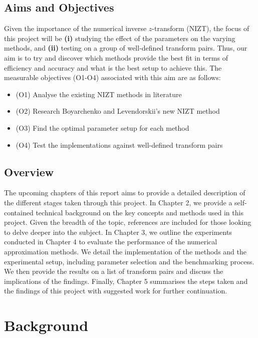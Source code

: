 \documentclass[a4paper]{report}
\begin{document}
\section{Aims and Objectives}
Given the importance of the numerical inverse $z$-transform (NIZT), the focus of this project will be \textbf{(i)} studying the effect of the parameters on the varying methods, and \textbf{(ii)} testing on a group of well-defined transform pairs. Thus, our aim is to try and discover which methods provide the best fit in terms of efficiency and accuracy and what is the best setup to achieve this. The measurable objectives (O1-O4) associated with this aim are as follows:

\begin{itemize}
	\item (O1) Analyse the existing NIZT methods in literature
	\item (O2) Research Boyarchenko and Levendorskii's new NIZT method
	\item (O3) Find the optimal parameter setup for each method
	\item (O4) Test the implementations against well-defined transform pairs
\end{itemize}

\section{Overview}
The upcoming chapters of this report aims to provide a detailed description of the different stages taken through this project. In Chapter 2, we provide a self-contained technical background on the key concepts and methods used in this project. Given the breadth of the topic, references are included for those looking to delve deeper into the subject. In Chapter 3, we outline the experiments conducted in Chapter 4 to evaluate the performance of the numerical approximation methods. We detail the implementation of the methods and the experimental setup, including parameter selection and the benchmarking process. We then provide the results on a list of transform pairs and discuss the implications of the findings. Finally, Chapter 5 summarises the steps taken and the findings of this project with suggested work for further continuation. 

\chapter{Background}
\end{document}
